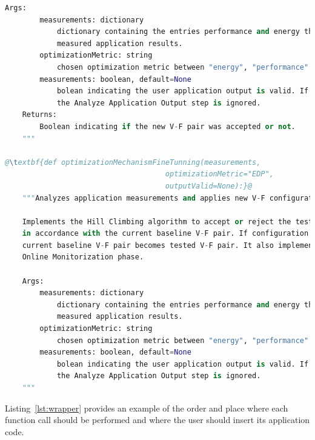 \begin{lstlisting}[language=Python, caption=Python wrapper documentation., label=lst:wrapper_doc, basicstyle=\footnotesize\ttfamily,abovecaptionskip=0pt, captionpos=b,escapechar=@]
    Args:
        measurements: dictionary
            dictionary containing the entries performance and energy that indicate the
            measured application results.
        optimizationMetric: string
            chosen optimization metric between "energy", "performance" and "EDP".
        measurements: boolean, default=None
            bolean indicating the user application output is valid. If equal to None,
            the Analyze Application Output step is ignored.
    Returns:
        Boolean indicating if the new V-F pair was accepted or not.
    """
    
@\textbf{def optimizationMechanismFineTunning(measurements, 
                                     optimizationMetric="EDP", 
                                     outputValid=None):}@
    """Analyzes application measurements and applies new V-F configuration
    
    Implements the Hill Climbing algorithm to accept or reject the tested V-F pair
    in accordance with the current baseline V-F pair. If configuration is accepted,
    current baseline V-F pair becomes tested V-F pair. It also implements the 
    Online Monitorization phase.
    
    Args:
        measurements: dictionary
            dictionary containing the entries performance and energy that indicate the
            measured application results.
        optimizationMetric: string
            chosen optimization metric between "energy", "performance" and "EDP".
        measurements: boolean, default=None
            bolean indicating the user application output is valid. If equal to None,
            the Analyze Application Output step is ignored.
    """
\end{lstlisting}


Listing~\ref{lst:wrapper} provides an example of the order and place where each function call should be performed and where the user should insert its application code.

